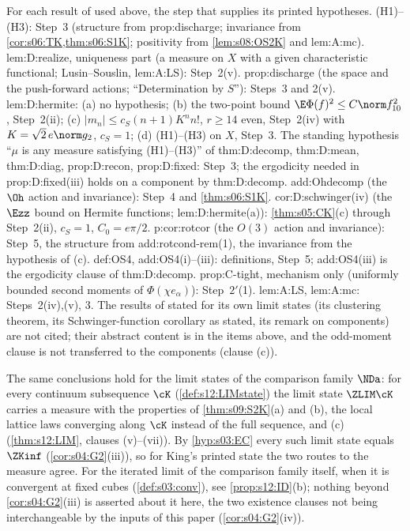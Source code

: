 \begin{remark}\label{rem:s09:v1match}
For each result of \cite{SymPhase} used above, the step that supplies its printed hypotheses. (H1)--(H3): Step~3 (structure from prop:discharge; invariance from \cref{cor:s06:TK,thm:s06:S1K}; positivity from \cref{lem:s08:OS2K} and lem:A:mc). lem:D:realize, uniqueness part (a measure on $X$ with a given characteristic functional; Lusin--Souslin, lem:A:LS): Step~2(v). prop:discharge (the space and the push-forward actions; ``Determination by $S$''): Steps~3 and 2(v). lem:D:hermite: (a) no hypothesis; (b) the two-point bound $\E\Phi(f)^2\le C\norm f_{10}^2$, Step~2(ii); (c) $|m_n|\le c_S(n+1)K^nn!$, $r\ge14$ even, Step~2(iv) with $K=\sqrt2\,e\norm g_2$, $c_S=1$; (d) (H1)--(H3) on $X$, Step~3. The standing hypothesis ``$\mu$ is any measure satisfying (H1)--(H3)'' of thm:D:decomp, thm:D:mean, thm:D:diag, prop:D:recon, prop:D:fixed: Step~3; the ergodicity needed in prop:D:fixed(iii) holds on a component by thm:D:decomp. add:Ohdecomp (the $\Oh$ action and invariance): Step~4 and \cref{thm:s06:S1K}. cor:D:schwinger(iv) (the $\Ezz$ bound on Hermite functions; lem:D:hermite(a)): \cref{thm:s05:CK}(c) through Step~2(ii), $c_S=1$, $C_0=e\pi/2$. p:cor:rotcor (the $O(3)$ action and invariance): Step~5, the structure from add:rotcond-rem(1), the invariance from the hypothesis of (c). def:OS4, add:OS4(i)--(iii): definitions, Step~5; add:OS4(iii) is the ergodicity clause of thm:D:decomp. prop:C-tight, mechanism only (uniformly bounded second moments of $\Phi(\chi e_\alpha)$): Step~$2'$(1). lem:A:LS, lem:A:mc: Steps~2(iv),(v), 3. The results of \cite{SymPhase} stated for its own limit states (its clustering theorem, its Schwinger-function corollary as stated, its remark on components) are not cited; their abstract content is in the items above, and the odd-moment clause is not transferred to the components (clause (c)).
\end{remark}

\begin{remark}\label{rem:s09:components}
The same conclusions hold for the limit states of the comparison family $\NDa$: for every continuum subsequence $\cK$ (\cref{def:s12:LIMstate}) the limit state $\ZLIM\cK$ carries a measure with the properties of \cref{thm:s09:S2K}(a) and (b), the local lattice laws converging along $\cK$ instead of the full sequence, and (c) (\cref{thm:s12:LIM}, clauses (v)--(vii)). By \cref{hyp:s03:EC} every such limit state equals $\ZKinf$ (\cref{cor:s04:G2}(iii)), so for King's printed state the two routes to the measure agree. For the iterated limit of the comparison family itself, when it is convergent at fixed cubes (\cref{def:s03:conv}), see \cref{prop:s12:ID}(b); nothing beyond \cref{cor:s04:G2}(iii) is asserted about it here, the two existence clauses not being interchangeable by the inputs of this paper (\cref{cor:s04:G2}(iv)).
\end{remark}
